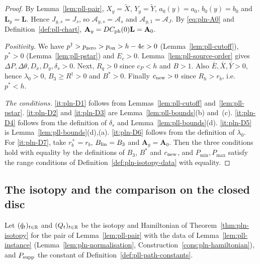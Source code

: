 \begin{proof}
By Lemma~\ref{lem:pll-pair}, $X_y=\tilde X$, $Y_y=\tilde Y$, $a_0(y)=a_0$, $b_0(y)=b_0$ and $\mathbf L_y=\mathbf L$. Hence $J_{y,s}=J_s$, so $\mathcal A_{y,s}=\mathcal A_s$ and $\mathcal A_{y,1}=\mathcal A_J$. By \eqref{eq:pln-A0} and Definition~\ref{def:pll-chart}, $\mathbf A_y=DC_{\rm ph}(0)\mathbf L=\mathbf A_0$.

\emph{Positivity.} We have $p^\dagger>p_{\rm zero}>p_{\rm on}>h-4e>0$ (Lemma~\ref{lem:pll-cutoff}), $p^*>0$ (Lemma~\ref{lem:pll-pstar}) and $E_c>0$. Lemma~\ref{lem:pll-source-order} gives $\Delta P,\Delta\theta,D_x,D_y,\delta_s>0$. Next, $R_q>0$ since $c_P<h$ and $B>1$. Also $\bar E,\bar X,\bar Y>0$, hence $\lambda_0>0$, $B_3\ge R^\dagger>0$ and $B^*>0$. Finally $c_{\rm new}>0$ since $R_h>r_b$, i.e.\ $p^*<h$.

\emph{The conditions.} \ref{it:pln-D1} follows from Lemmas~\ref{lem:pll-cutoff} and~\ref{lem:pll-pstar}. \ref{it:pln-D2} and \ref{it:pln-D3} are Lemma~\ref{lem:pll-bounds}(b) and~(c). \ref{it:pln-D4} follows from the definition of $\delta_s$ and Lemma~\ref{lem:pll-bounds}(d). \ref{it:pln-D5} is Lemma~\ref{lem:pll-bounds}(d),(a). \ref{it:pln-D6} follows from the definition of $\lambda_0$. For \ref{it:pln-D7}, take $r_b^+=r_b$, $B_{\rm lin}=B_3$ and $\mathbf A_y=\mathbf A_0$. Then the three conditions hold with equality by the definitions of $B_3$, $B^*$ and $c_{\rm new}$, and $P_{\min},P_{\max}$ satisfy the range conditions of Definition~\ref{def:pln-isotopy-data} with equality.
\end{proof}

\subsection{The isotopy and the comparison on the closed disc}\label{sec:pll-main}

Let $(\hat q_t)_{t\in\mathbb{R}}$ and $(Q_t)_{t\in\mathbb{R}}$ be the isotopy and Hamiltonian of Theorem~\ref{thm:pln-isotopy} for the pair of Lemma~\ref{lem:pll-pair} with the data of Lemma~\ref{lem:pll-instance} (Lemma~\ref{lem:pln-normalisation}, Construction~\ref{cons:pln-hamiltonian}), and $P_{\rm supp}$ the constant of Definition~\ref{def:pll-path-constants}.

